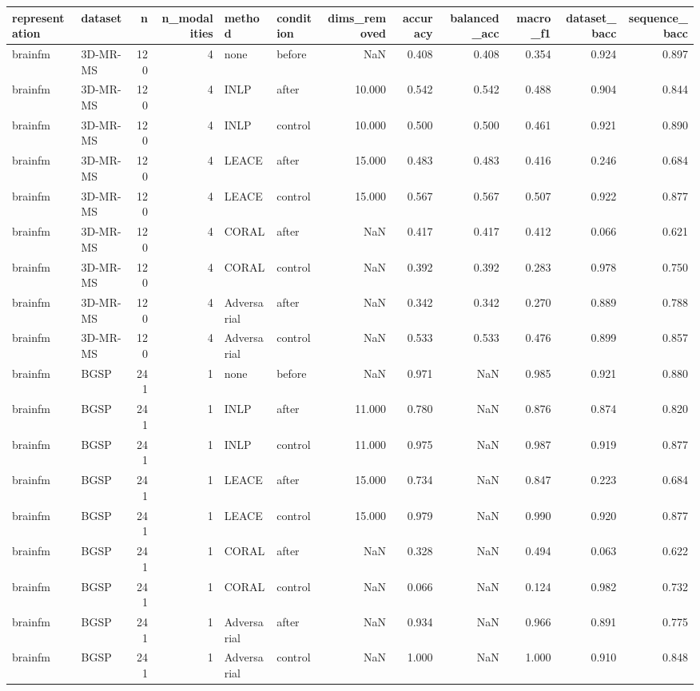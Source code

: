 \begin{tabular}{llrrllrrrrrr}
\toprule
representation & dataset & n & n\_modalities & method & condition & dims\_removed & accuracy & balanced\_acc & macro\_f1 & dataset\_bacc & sequence\_bacc \\
\midrule
brainfm & 3D-MR-MS & 120 & 4 & none & before & NaN & 0.408 & 0.408 & 0.354 & 0.924 & 0.897 \\
brainfm & 3D-MR-MS & 120 & 4 & INLP & after & 10.000 & 0.542 & 0.542 & 0.488 & 0.904 & 0.844 \\
brainfm & 3D-MR-MS & 120 & 4 & INLP & control & 10.000 & 0.500 & 0.500 & 0.461 & 0.921 & 0.890 \\
brainfm & 3D-MR-MS & 120 & 4 & LEACE & after & 15.000 & 0.483 & 0.483 & 0.416 & 0.246 & 0.684 \\
brainfm & 3D-MR-MS & 120 & 4 & LEACE & control & 15.000 & 0.567 & 0.567 & 0.507 & 0.922 & 0.877 \\
brainfm & 3D-MR-MS & 120 & 4 & CORAL & after & NaN & 0.417 & 0.417 & 0.412 & 0.066 & 0.621 \\
brainfm & 3D-MR-MS & 120 & 4 & CORAL & control & NaN & 0.392 & 0.392 & 0.283 & 0.978 & 0.750 \\
brainfm & 3D-MR-MS & 120 & 4 & Adversarial & after & NaN & 0.342 & 0.342 & 0.270 & 0.889 & 0.788 \\
brainfm & 3D-MR-MS & 120 & 4 & Adversarial & control & NaN & 0.533 & 0.533 & 0.476 & 0.899 & 0.857 \\
brainfm & BGSP & 241 & 1 & none & before & NaN & 0.971 & NaN & 0.985 & 0.921 & 0.880 \\
brainfm & BGSP & 241 & 1 & INLP & after & 11.000 & 0.780 & NaN & 0.876 & 0.874 & 0.820 \\
brainfm & BGSP & 241 & 1 & INLP & control & 11.000 & 0.975 & NaN & 0.987 & 0.919 & 0.877 \\
brainfm & BGSP & 241 & 1 & LEACE & after & 15.000 & 0.734 & NaN & 0.847 & 0.223 & 0.684 \\
brainfm & BGSP & 241 & 1 & LEACE & control & 15.000 & 0.979 & NaN & 0.990 & 0.920 & 0.877 \\
brainfm & BGSP & 241 & 1 & CORAL & after & NaN & 0.328 & NaN & 0.494 & 0.063 & 0.622 \\
brainfm & BGSP & 241 & 1 & CORAL & control & NaN & 0.066 & NaN & 0.124 & 0.982 & 0.732 \\
brainfm & BGSP & 241 & 1 & Adversarial & after & NaN & 0.934 & NaN & 0.966 & 0.891 & 0.775 \\
brainfm & BGSP & 241 & 1 & Adversarial & control & NaN & 1.000 & NaN & 1.000 & 0.910 & 0.848 \\

\end{tabular}
